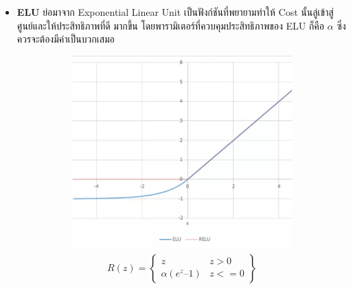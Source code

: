 \begin{itemize}
    \item \textbf{ELU} ย่อมาจาก Exponential Linear Unit เป็นฟังก์ชันที่พยายามทำให้ Cost นั้นลู่เข้าสู่ศูนย์และให้ประสิทธิภาพที่ดี%
    มากขึ้น โดยพารามิเตอร์ที่ควบคุมประสิทธิภาพของ ELU ก็คือ $\alpha$ ซึ่งควรจะต้องมีค่าเป็นบวกเสมอ
    \begin{figure}[htbp]
        \centering
        \begin{subfigure}{0.5\textwidth}
            \centering
            \includegraphics[width=0.9\linewidth]{fig/actfunc_elu.png}
            \caption{%
                \begin{equation}
                    \begin{split}R(z) = \begin{Bmatrix} z & z > 0 \\
                        \alpha (e^z – 1) & z <= 0 \end{Bmatrix}\end{split}
                \end{equation}
            }
            \label{fig:actfunc_elu}
        \end{subfigure}%
        \begin{subfigure}{0.5\textwidth}
            \centering

\end{subfigure}
\end{figure}
\end{itemize}
